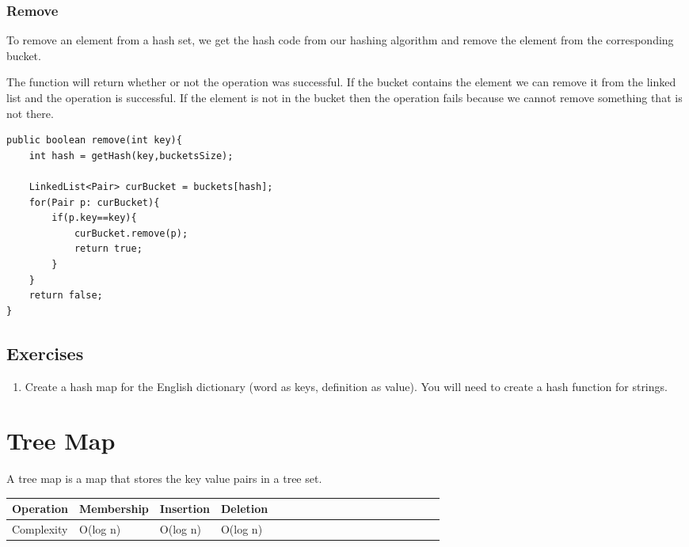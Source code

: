 \documentclass[11pt,oneside]{book}
\begin{document}
\subsubsection{Remove}

To remove an element from a hash set, we get the hash code from our hashing algorithm and remove the element from the corresponding bucket.

The function will return whether or not the operation was successful. If the bucket contains the element we can remove it from the linked list and the operation is successful. If the element is not in the bucket then the operation fails because we cannot remove something that is not there.

\begin{lstlisting}
public boolean remove(int key){
    int hash = getHash(key,bucketsSize);
    
    LinkedList<Pair> curBucket = buckets[hash];
    for(Pair p: curBucket){
        if(p.key==key){
            curBucket.remove(p);
            return true;
        }
    }
    return false;
}
\end{lstlisting}

\subsection{Exercises}

\begin{enumerate}
\item Create a hash map for the English dictionary (word as keys, definition as value). You will need to create a hash function for strings.
\end{enumerate}
\section{Tree Map}

A tree map is a map that stores the key value pairs in a tree set.

\vspace{10pt} \begin{tabular}{|l|l|l|l|l|l|l|l|l|l|l|l|l|l|l|l|l|l|l}\hline


  Operation &
  Membership &
  Insertion &
  Deletion\\
\hline


  Complexity &
  O(log n) &
  O(log n) &
  O(log n)\\

\hline\end{tabular}
\end{document}

